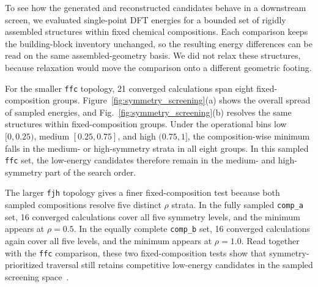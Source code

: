 \documentclass[pdflatex,sn-mathphys-num]{sn-jnl}
\theoremstyle{thmstyleone}%
\begin{document}
To see how the generated and reconstructed candidates behave in a downstream screen, we evaluated single-point DFT energies for a bounded set of rigidly assembled structures within fixed chemical compositions. Each comparison keeps the building-block inventory unchanged, so the resulting energy differences can be read on the same assembled-geometry basis. We did not relax these structures, because relaxation would move the comparison onto a different geometric footing.

For the smaller \texttt{ffc} topology, 21 converged calculations span eight fixed-composition groups. Figure~\ref{fig:symmetry_screening}(a) shows the overall spread of sampled energies, and Fig.~\ref{fig:symmetry_screening}(b) resolves the same structures within fixed-composition groups. Under the operational bins low $[0,0.25)$, medium $[0.25,0.75]$, and high $(0.75,1]$, the composition-wise minimum falls in the medium- or high-symmetry strata in all eight groups. In this sampled \texttt{ffc} set, the low-energy candidates therefore remain in the medium- and high-symmetry part of the search order.

The larger \texttt{fjh} topology gives a finer fixed-composition test because both sampled compositions resolve five distinct $\rho$ strata. In the fully sampled \texttt{comp\_a} set, 16 converged calculations cover all five symmetry levels, and the minimum appears at $\rho=0.5$. In the equally complete \texttt{comp\_b} set, 16 converged calculations again cover all five levels, and the minimum appears at $\rho=1.0$. Read together with the \texttt{ffc} comparison, these two fixed-composition tests show that symmetry-prioritized traversal still retains competitive low-energy candidates in the sampled screening space~\cite{peng2024learning,zeni2023mattergen,okabe2025structural}.
\end{document}
